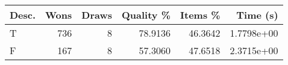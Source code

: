 \begin{tabular}{lrrrrr}
    \hline
    Desc. & Wons & Draws & Quality \% & Items \% & Time (s)   \\
    \hline
    T     & 736  & 8     & 78.9136    & 46.3642  & 1.7798e+00 \\
    F     & 167  & 8     & 57.3060    & 47.6518  & 2.3715e+00 \\
    \hline
\end{tabular}